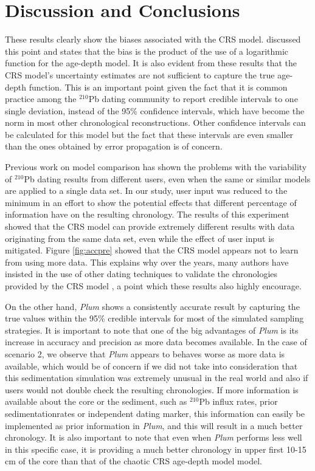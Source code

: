 \documentclass [10pt] {article}
\begin{document}
\section{Discussion and Conclusions}

These results clearly show the biases associated with the CRS model. 
\citet{Aquino2018} discussed this point and states that the bias is the product of the use of a logarithmic function for the age-depth model. 
It is also evident from these results that the CRS model's uncertainty estimates are not sufficient to capture the true age-depth function. 
This is an important point given the fact that it is common practice among the $^{210}$Pb dating community to report credible intervals to one single deviation, instead of the 95\% confidence intervals, which have become the norm in most other chronological reconstructions.
Other confidence intervals can be calculated for this model \citep{Sanchez-Cabeza2014} but the fact that these intervals are even smaller than the ones obtained by error propagation \citep{Appleby2001} is of concern. 

Previous work on model comparison \citep{Barsanti2020} has shown the problems with the variability of $^{210}$Pb dating results from different users, even when the same or similar models are applied to a single data set.
In our study, user input was reduced to the minimum in an effort to show the potential effects that different percentage of information have on the resulting chronology. 
The results of this experiment showed that the CRS model can provide extremely different results with data originating from the same data set, even while the effect of user input is mitigated. 
Figure \ref{fig:accpre} showed that the CRS model appears not to learn from using more data.
This explains why over the years, many authors have insisted in the use of other dating techniques to validate the chronologies provided by the CRS model \citep{Sanchez-Cabeza2012,Barsanti2020,Aquino2020}, a point which these results also highly encourage.


On the other hand, \textit{Plum} shows a consistently accurate result by capturing the true values within the 95\% credible intervals for most of the simulated sampling strategies. 
It is important to note that one of the big advantages of \textit{Plum} is its increase in accuracy and precision as more data becomes available.
In the case of scenario 2, we observe that \textit{Plum} appears to behaves worse as more data is available, which would be of concern if we did not take into consideration that this sedimentation simulation was extremely unusual in the real world and also if users would not double check the resulting chronologies. 
If more information is available about the core or the sediment, such as $^{210}$Pb influx rates, prior sedimentationrates or independent dating marker, this information can easily be implemented as prior information in \textit{Plum}, and this will result in a much better chronology.
It is also important to note that even when \textit{Plum} performs less well in this specific case, it is providing a much better chronology in upper first 10-15 cm of the core than that of the chaotic CRS age-depth model model.
\end{document}
